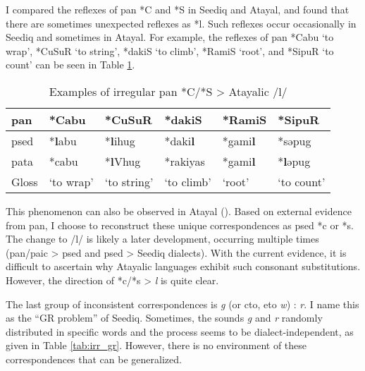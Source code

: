 I compared the reflexes of \acl{pan} *C and *S in Seediq and Atayal, and found that there are sometimes unexpected reflexes as *l. Such reflexes occur occasionally in Seediq and sometimes in Atayal. For example, the reflexes of \acl{pan} *Cabu `to wrap', *CuSuR `to string', *dakiS `to climb', *RamiS `root', and *SipuR `to count' can be seen in Table \ref{tab:panclsaic}.

\begin{table}[!htbp]
\centering
\caption{Examples of irregular \acs{pan} *C/*S > Atayalic /l/}
\label{tab:panclsaic}
\begin{tabular}{llllll}
\hline
\acs{pan}  & *Cabu     & *CuSuR      & *dakiS     & *RamiS & *SipuR    \\ \hline
\acs{psed} & *\textbf{l}abu     & *\textbf{l}ihug      & *daki\textbf{l}     & *gami\textbf{l} & *səpug    \\
\acs{pata} & *cabu     & *\textbf{l}Vhug      & *rakiyas   & *gami\textbf{l} & *\textbf{l}əpug    \\ \hline
Gloss      & `to wrap' & `to string' & `to climb' & `root' & `to count' \\ \hline
\end{tabular}
\end{table}

This phenomenon can also be observed in Atayal (\cite[173]{goderich2020phd}). Based on external evidence from \acl{pan}, I choose to reconstruct these unique correspondences as \acl{psed} *c or *s. The change to /l/ is likely a later development, occurring multiple times (\acs{pan}/\acs{paic} > \acs{psed} and \acs{psed} > Seediq dialects). With the current evidence, it is difficult to ascertain why Atayalic languages exhibit such consonant substitutions. However, the direction of *c/*s > \textit{l} is quite clear.

The last group of inconsistent correspondences is \textit{g} (or \ac{cto}, \ac{eto} \textit{w}) : \textit{r}. I name this as the ``GR problem'' of Seediq. Sometimes, the sounds \textit{g} and \textit{r} randomly distributed in specific words and the process seems to be dialect-independent, as given in Table \ref{tab:irr_gr}. However, there is no environment of these correspondences that can be generalized. 

